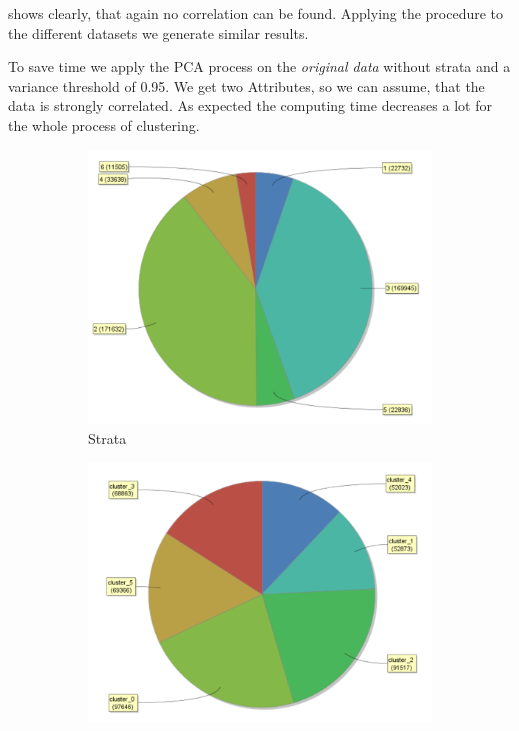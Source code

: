  shows clearly, that again no correlation can be found. Applying the procedure to the different datasets we generate similar results.


To save time we apply the PCA process on the \textit{original data} without strata and a variance
threshold of 0.95. We get two Attributes, so we can assume, that the data is strongly correlated. As expected the computing time decreases a lot for the whole process of clustering. 


\begin{figure}[H]
\vspace*{-1em}
\centering
\begin{subfigure}{.3\textwidth}
  \centering
  \includegraphics[width=.9\linewidth]{ClusterPCAOrigRapidStrata.PNG}
  \caption{Strata}
  \label{fig:PCAOrgSt}
\end{subfigure}%
\begin{subfigure}{.3\textwidth}
  \centering
  \includegraphics[width=.9\linewidth]{ClusterPCAOrigRapidCluster.PNG}

\end{subfigure}
\end{figure}
